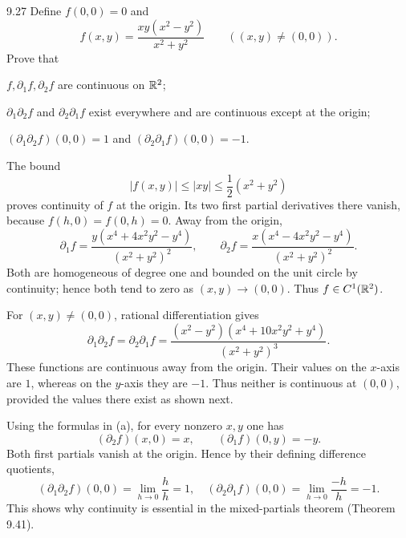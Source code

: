 \documentclass[11pt,oneside]{article}
\begin{document}
\begin{exercise}{9.27}
Define $f(0,0)=0$ and
\[
 f(x,y)=\frac{xy(x^2-y^2)}{x^2+y^2}\qquad((x,y)\ne(0,0)).
\]
Prove that
\begin{exercisesubparts}
\item $f,\partial_1f,\partial_2f$ are continuous on $\mathbb{R}^2$;
\item $\partial_1\partial_2f$ and $\partial_2\partial_1f$ exist everywhere and are continuous except at the origin;
\item $(\partial_1\partial_2f)(0,0)=1$ and $(\partial_2\partial_1f)(0,0)=-1$.
\end{exercisesubparts}
\end{exercise}
\begin{solution}
\begin{exercisesubparts}
\item The bound
\[
 |f(x,y)|\le|xy|\le\frac12(x^2+y^2)
\]
proves continuity of $f$ at the origin. Its two first partial derivatives there vanish, because $f(h,0)=f(0,h)=0$. Away from the origin,
\[
 \partial_1f=\frac{y(x^4+4x^2y^2-y^4)}{(x^2+y^2)^2},\qquad
 \partial_2f=\frac{x(x^4-4x^2y^2-y^4)}{(x^2+y^2)^2}.
\]
Both are homogeneous of degree one and bounded on the unit circle by continuity; hence both tend to zero as $(x,y)\to(0,0)$. Thus $f\in C^1(\mathbb{R}^2)$.
\item For $(x,y)\ne(0,0)$, rational differentiation gives
\[
 \partial_1\partial_2f
 =\partial_2\partial_1f
 =\frac{(x^2-y^2)(x^4+10x^2y^2+y^4)}{(x^2+y^2)^3}.
\]
These functions are continuous away from the origin. Their values on the $x$-axis are $1$, whereas on the $y$-axis they are $-1$. Thus neither is continuous at $(0,0)$, provided the values there exist as shown next.
\item Using the formulas in (a), for every nonzero $x,y$ one has
\[
 (\partial_2f)(x,0)=x,\qquad
 (\partial_1f)(0,y)=-y.
\]
Both first partials vanish at the origin. Hence by their defining difference quotients,
\[
 (\partial_1\partial_2f)(0,0)=\lim_{h\to0}\frac{h}{h}=1,
\quad
 (\partial_2\partial_1f)(0,0)=\lim_{h\to0}\frac{-h}{h}=-1.
\]
This shows why continuity is essential in the mixed-partials theorem (Theorem 9.41).
\end{exercisesubparts}
\end{solution}
\end{document}
